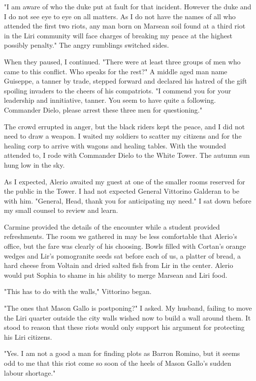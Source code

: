 \documentclass{article}
\begin{document}
"I am aware of who the duke put at fault for that incident. However the duke and I do not see eye to eye on all matters. As I do not have the names of all who attended the first two riots, any man born on Marsean soil found at a third riot in the Liri community will face charges of breaking my peace at the highest possibly penalty." The angry rumblings switched sides.

When they paused, I continued. "There were at least three groups of men who came to this conflict. Who speaks for the rest?" A  middle aged man name Guiseppe, a tanner by trade, stepped forward and declared his hatred of the gift spoiling invaders to the cheers of his compatriots. "I commend you for your leadership and innitiative, tanner. You seem to have quite a following. Commander Dielo, please arrest these three men for questioning." 

The crowd errupted in anger, but the black riders kept the peace, and I did not need to draw a weapon. I waited my soldiers to scatter my citizens and for the healing corp to arrive with wagons and healing tables. With the wounded attended to, I rode with Commander Dielo to the White Tower. The autumn sun hung low in the sky.

As I expected, Alerio awaited my guest at one of the smaller rooms reserved for the public in the Tower. I had not expected General Vittorino Galderan to be with him. "General, Head, thank you for anticipating my need." I sat down before my small counsel to review and learn.

Carmine provided the details of the encounter while a student provided refreshments. The room we gathered in may be less comfortable that Alerio's office, but the fare was clearly of his choosing. Bowls filled with Cortan's orange wedges and Lir's pomogranite seeds sat before each of us, a platter of bread, a hard cheese from Voltain and dried salted fish from Lir in the center. Alerio would put Sophia to shame in his ability to merge Marsean and Liri food.

"This has to do with the walls," Vittorino began.

"The ones that Mason Gallo is postponing?" I asked. My husband, failing to move the Liri quarter outside the city walls wished now to build a wall around them. It stood to reason that these riots would only support his argument for protecting his Liri citizens.

"Yes. I am not a good a man for finding plots as Barron Romino, but it seems odd to me that this riot come so soon of the heels of Mason Gallo's sudden labour shortage." 
\end{document}
